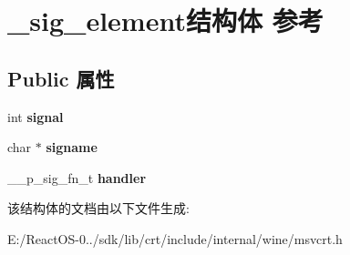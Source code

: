 \hypertarget{struct__sig__element}{}\section{\+\_\+sig\+\_\+element结构体 参考}
\label{struct__sig__element}
\subsection*{Public 属性}
\begin{DoxyCompactItemize}
\item 
\mbox{\label{struct__sig__element_aace17b190ef3552a2b030474bf1e5d19}} 
int {\bfseries signal}
\item 
\mbox{\label{struct__sig__element_a7613a1399fffff3f6c03cf6e4b124fbe}} 
char $\ast$ {\bfseries signame}
\item 
\mbox{\label{struct__sig__element_a1707f23518cc1652cb7cfeaed198e5a8}} 
\+\_\+\+\_\+p\+\_\+sig\+\_\+fn\+\_\+t {\bfseries handler}
\end{DoxyCompactItemize}


该结构体的文档由以下文件生成\+:\begin{DoxyCompactItemize}
\item 
E\+:/\+React\+O\+S-\/0../sdk/lib/crt/include/internal/wine/msvcrt.\+h\end{DoxyCompactItemize}
